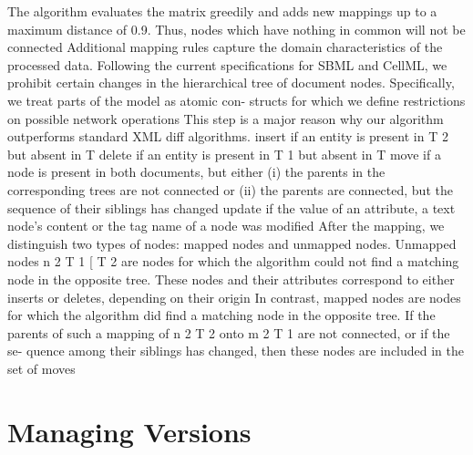 \begin{itemize}
		\subitem The algorithm evaluates the matrix greedily and adds new mappings up to a maximum distance of 0.9. Thus, nodes which have nothing in common will not be connected 
		\subitem Additional mapping rules capture the domain characteristics of the processed data. Following the current specifications for SBML and CellML, we prohibit certain changes in the hierarchical tree of document nodes. Specifically, we treat parts of the model as atomic con- structs for which we define restrictions on possible network operations 
		\subitem This step is a major reason why our algorithm outperforms standard XML diff algorithms. 
		\subitem insert if an entity is present in T 2 but absent in T 
		\subitem delete if an entity is present in T 1 but absent in T 
		\subitem move if a node is present in both documents, but either (i) the parents in the corresponding trees are not connected or (ii) the parents are connected, but the sequence of their siblings has changed 
		\subitem update if the value of an attribute, a text node's content or the tag name of a node was modified
		\subitem After the mapping, we distinguish two types of nodes: mapped nodes and unmapped nodes. Unmapped nodes n 2 T 1 [ T 2 are nodes for which the algorithm could not find a matching node in the opposite tree. These nodes and their attributes correspond to either inserts or deletes, depending on their origin 
		\subitem In contrast, mapped nodes are nodes for which the algorithm did find a matching node in the opposite tree. If the parents of such a mapping of n 2 T 2 onto m 2 T 1 are not connected, or if the se- quence among their siblings has changed, then these nodes are included in the set of moves 
	\end{itemize}
	
\section{Managing Versions}
